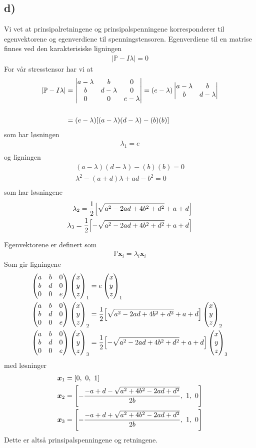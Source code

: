 \documentclass[12p,a4paper]{article}
\renewcommand{\b}{\boldsymbol}
\newcommand{\m}{\mathbb}
\newcommand{\xvec}{\begin{pmatrix} x\\y\\z \end{pmatrix}}
\newcommand{\ptensor}{\begin{pmatrix} a & b & 0 \\ b & d & 0 \\ 0 & 0 & e \end{pmatrix}}
\begin{document}
\subsection*{d)}
Vi vet at prinsipalretningene og prinsipalspenningene korresponderer til egenvektorene og egenverdiene til spenningstensoren.
Egenverdiene til en matrise finnes ved den karakterisiske ligningen
\begin{align*}
    |\m P - I \lambda| = 0
\end{align*}
For vår stresstensor har vi at
\begin{align*}
    |\m P - I \lambda| &= \begin{vmatrix} a - \lambda & b & 0 \\ b & d - \lambda & 0 \\ 0 & 0 & e - \lambda \end{vmatrix}
    = (e-\lambda)\begin{vmatrix} a - \lambda & b \\ b & d-\lambda \end{vmatrix} \\ \\
    &= (e-\lambda)\qty[(a-\lambda)(d-\lambda) - (b)(b)] \\
\end{align*}
som har løsningen
\begin{align*}
    \lambda_1 = e \\
\end{align*}
og ligningen
\begin{align*}
    (a-\lambda)(d-\lambda) - (b)(b) = 0 \\
    \lambda^2 - (a + d)\lambda + ad - b^2 = 0 \\
\end{align*}
som har løsningene
\begin{align*}
    \lambda_2 = \frac{1}{2}\qty[\sqrt{a^2 -2ad +4b^2 +d^2} +a +d] \\
    \lambda_3 = \frac{1}{2}\qty[-\sqrt{a^2 -2ad +4b^2 +d^2} +a +d]
\end{align*}

Egenvektorene er definert som
\begin{align*}
    \m P \b x_i = \lambda_i \b x_i
\end{align*}
Som gir ligningene
\begin{align*}
    \ptensor \xvec_1 &= e \xvec_1 \\
    \ptensor \xvec_2 &= \frac{1}{2}\qty[\sqrt{a^2 -2ad +4b^2 +d^2} +a +d] \xvec_2 \\
    \ptensor \xvec_3 &= \frac{1}{2}\qty[-\sqrt{a^2 -2ad +4b^2 +d^2} +a +d] \xvec_3
\end{align*}
med løsninger
\begin{align*}
    \b x_1 &= \qty[0,\ 0,\ 1] \\
    \b x_2 &= \qty[ -\frac{-a+d-\sqrt{a^2 +4b^2 -2ad +d^2}}{2b},\ 1,\ 0] \\
    \b x_3 &= \qty[ -\frac{-a+d+\sqrt{a^2 +4b^2 -2ad +d^2}}{2b},\ 1,\ 0]
\end{align*}
Dette er altså prinsipalspenningene og retningene.
\end{document}
